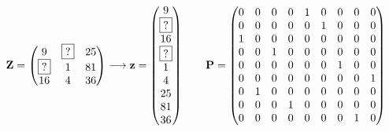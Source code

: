 \begin{example}[H]
	\[
	\mathbf{Z} = \left(
		\begin{matrix}
			9 & \boxed{?} & 25\\
			\boxed{?} &  1 & 81\\
			16 &  4 & 36\\
		\end{matrix}
	\right)
	\longrightarrow
	\mathbf{z} = \left(
		\begin{matrix}
			9 \\ \boxed{?} \\ 16 \\ \boxed{?} \\ 1 \\ 4 \\ 25 \\ 81 \\ 36\\
		\end{matrix}
	\right)
	\qquad
	\mathbf{P} = \left(
		\begin{matrix}
			0&0&0&0&1&0&0&0&0\\
			0&0&0&0&0&1&0&0&0\\
			1&0&0&0&0&0&0&0&0\\
			0&0&1&0&0&0&0&0&0\\
			0&0&0&0&0&0&1&0&0\\
			0&0&0&0&0&0&0&0&1\\
			0&1&0&0&0&0&0&0&0\\
			0&0&0&1&0&0&0&0&0\\
			0&0&0&0&0&0&0&1&0\\
		\end{matrix}
	\right)
	\]
\end{example}
